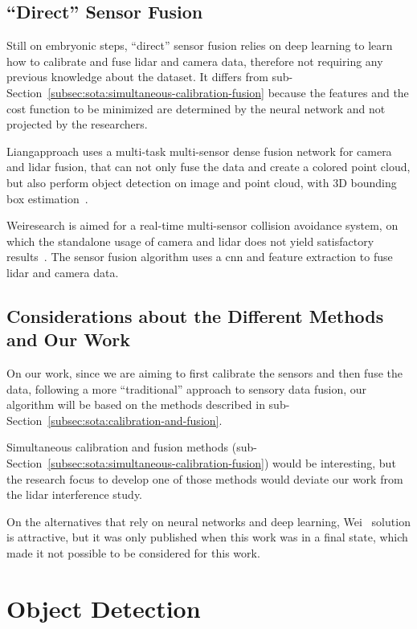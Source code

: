 \subsection{``Direct'' Sensor Fusion}
Still on embryonic steps, ``direct'' sensor fusion relies on deep learning to learn how to calibrate and fuse \ac{lidar} and camera data, therefore not requiring any previous knowledge about the dataset. It differs from sub-Section~\ref{subsec:sota:simultaneous-calibration-fusion} because the features and the cost function to be minimized are determined by the neural network and not projected by the researchers.

Liang\etal approach uses a multi-task multi-sensor dense fusion network for camera and \ac{lidar} fusion, that can not only fuse the data and create a colored point cloud, but also perform object detection on image and point cloud, with 3D bounding box estimation~\cite{Liang2019}.

Wei\etal research is aimed for a real-time multi-sensor collision avoidance system, on which the standalone usage of camera and \ac{lidar} does not yield satisfactory results~\cite{Wei2018}. The sensor fusion algorithm uses a \ac{cnn} and feature extraction to fuse \ac{lidar} and camera data. 

\subsection{Considerations about the Different Methods and Our Work}
On our work, since we are aiming to first calibrate the sensors and then fuse the data, following a more ``traditional'' approach to sensory data fusion, our algorithm will be based on the methods described in sub-Section~\ref{subsec:sota:calibration-and-fusion}. 

Simultaneous calibration and fusion methods (sub-Section~\ref{subsec:sota:simultaneous-calibration-fusion}) would be interesting, but the research focus to develop one of those methods would deviate our work from the \ac{lidar} interference study.

On the alternatives that rely on neural networks and deep learning, Wei\etal~\cite{Wei2018} solution is attractive, but it was only published when this work was in a final state, which made it not possible to be considered for this work.

\section{Object Detection}
\label{sec:sota:object-detection}

